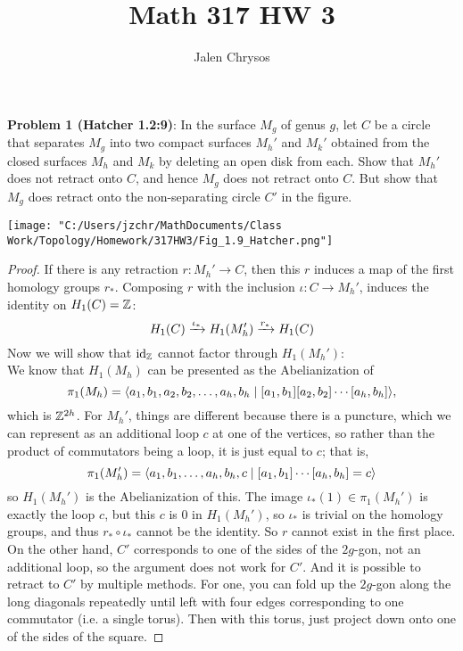 \documentclass{amsart}
\title{Math 317 HW 3}
\author{Jalen Chrysos}
\begin{document}
	\maketitle

\textbf{Problem 1 (Hatcher 1.2:9)}: In the surface $M_g$ of genus $g$, let $C$ be a circle that separates $M_g$ into two compact surfaces $M_h'$ and $M_k'$ obtained from the closed surfaces $M_h$ and $M_k$ by deleting an open disk from each. Show that $M_h'$ does not retract onto $C$, and hence $M_g$ does not retract onto $C$. But show that $M_g$ does retract onto the non-separating circle $C'$ in the figure.

\begin{center}
\texttt{[image: "C:/Users/jzchr/MathDocuments/Class Work/Topology/Homework/317HW3/Fig\_1.9\_Hatcher.png"]}
\end{center}

\begin{proof}
	If there is any retraction $r:M_h'\to C$, then this $r$ induces a map of the first homology groups $r_*$. Composing $r$ with the inclusion $\iota:C\to M_h'$, induces the identity on $H_1(C)=\mathbb{Z}$:
	$$
	H_1(C)\xrightarrow{\iota_*} H_1(M_h')\xrightarrow{r_*} H_1(C)
	$$
	Now we will show that $\operatorname{id}_{\mathbb{Z}}$ cannot factor through $H_1(M_h')$:\\
	
	We know that $H_1(M_h)$ can be presented as the Abelianization of
	$$
	\pi_1(M_h) = \langle a_1,b_1,a_2,b_2,\dots,a_h,b_h \; | \; [a_1,b_1][a_2,b_2]\cdots [a_h,b_h]\rangle,
	$$
	which is $\mathbb{Z}^{2h}$. For $M_h'$, things are different because there is a puncture, which we can represent as an additional loop $c$ at one of the vertices, so rather than the product of commutators being a loop, it is just equal to $c$; that is,
	$$
	\pi_1(M_h') = \langle a_1,b_1,\dots,a_h,b_h,c \; | \; [a_1,b_1]\cdots[a_h,b_h] = c\rangle
	$$
	so $H_1(M_h')$ is the Abelianization of this. The image $\iota_*(1)\in \pi_1(M_h')$ is exactly the loop $c$, but this $c$ is 0 in $H_1(M_h')$, so $\iota_*$ is trivial on the homology groups, and thus $r_*\circ \iota_*$ cannot be the identity. So $r$ cannot exist in the first place.\\
	
	On the other hand, $C'$ corresponds to one of the sides of the $2g$-gon, not an additional loop, so the argument does not work for $C'$. And it is possible to retract to $C'$ by multiple methods. For one, you can fold up the $2g$-gon along the long diagonals repeatedly until left with four edges corresponding to one commutator (i.e. a single torus). Then with this torus, just project down onto one of the sides of the square.
\end{proof}
\end{document}
